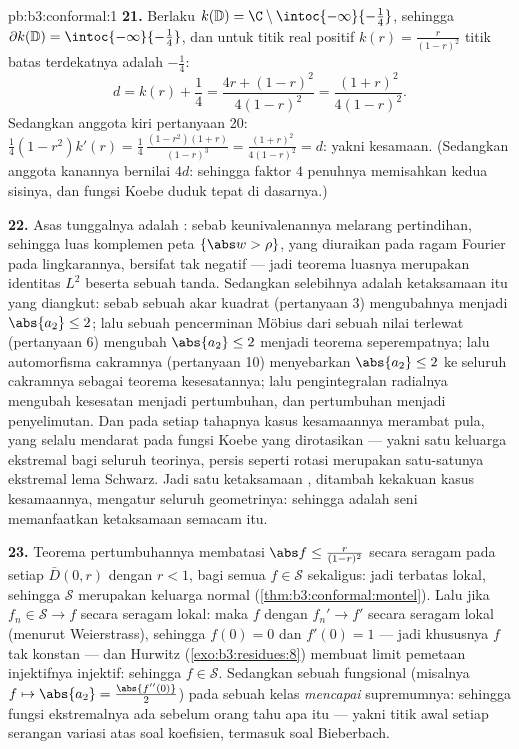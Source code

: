 \begin{solution}{pb:b3:conformal:1}
\textbf{21.} Berlaku $k(\mathbb D) = \C\setminus
\intoc{-\infty}{-\frac14}$, sehingga $\partial k(\mathbb D) =
\intoc{-\infty}{-\frac14}$, dan untuk titik real positif
$k(r) = \frac r{(1-r)^2}$ titik batas terdekatnya adalah
$-\frac14$:
\[
d = k(r) + \frac14 = \frac{4r + (1-r)^2}{4(1-r)^2}
= \frac{(1+r)^2}{4(1-r)^2} .
\]
Sedangkan anggota kiri pertanyaan 20: $\frac14(1 - r^2)k'(r) =
\frac14\,\frac{(1-r^2)(1+r)}{(1-r)^3} =
\frac{(1+r)^2}{4(1-r)^2} = d$: yakni kesamaan. (Sedangkan anggota kanannya
bernilai $4d$: sehingga faktor $4$ penuhnya memisahkan kedua sisinya,
dan fungsi Koebe duduk tepat di dasarnya.)

\textbf{22.} Asas tunggalnya adalah : sebab keunivalenannya
melarang pertindihan, sehingga luas komplemen peta
$\{\abs w > \rho\}$, yang diuraikan pada ragam Fourier pada
lingkarannya, bersifat tak negatif --- jadi teorema luasnya merupakan
identitas $L^2$ beserta sebuah tanda. Sedangkan selebihnya adalah ketaksamaan itu
yang diangkut: sebab sebuah akar kuadrat (pertanyaan 3) mengubahnya menjadi
$\abs{a_2} \leq 2$; lalu sebuah pencerminan Möbius dari sebuah nilai
terlewat (pertanyaan 6) mengubah $\abs{a_2} \leq 2$ menjadi teorema
seperempatnya; lalu automorfisma cakramnya (pertanyaan 10) menyebarkan $\abs{a_2}
\leq 2$ ke seluruh cakramnya sebagai teorema kesesatannya;
lalu pengintegralan radialnya mengubah kesesatan menjadi pertumbuhan, dan
pertumbuhan menjadi penyelimutan. Dan pada setiap tahapnya kasus kesamaannya
merambat pula, yang selalu mendarat pada fungsi Koebe yang
dirotasikan --- yakni satu keluarga ekstremal bagi seluruh teorinya, persis
seperti rotasi merupakan satu-satunya ekstremal lema
Schwarz. Jadi satu ketaksamaan , ditambah kekakuan
kasus kesamaannya, mengatur seluruh geometrinya: sehingga  adalah seni memanfaatkan ketaksamaan semacam itu.

\textbf{23.} Teorema pertumbuhannya membatasi $\abs f \leq
\frac{r}{(1-r)^2}$ secara seragam pada setiap $\bar D(0, r)$ dengan $r <
1$, bagi semua $f \in \mathcal S$ sekaligus: jadi terbatas lokal, sehingga
$\mathcal S$ merupakan keluarga normal
(\cref{thm:b3:conformal:montel}). Lalu jika $f_n \in \mathcal S \to
f$ secara seragam lokal: maka $f$  dengan $f_n' \to f'$
secara seragam lokal (menurut Weierstrass), sehingga $f(0) = 0$ dan $f'(0) = 1$
--- jadi khususnya $f$ tak konstan --- dan Hurwitz
(\cref{exo:b3:residues:8}) membuat limit pemetaan injektifnya
injektif: sehingga $f \in \mathcal S$. Sedangkan sebuah fungsional  (misalnya
$f \mapsto \abs{a_2} = \frac{\abs{f''(0)}}2$) pada sebuah
kelas  \emph{mencapai} supremumnya: sehingga fungsi
ekstremalnya ada sebelum orang tahu apa itu --- yakni titik
awal setiap serangan variasi atas soal
koefisien, termasuk soal Bieberbach.


\end{solution}
